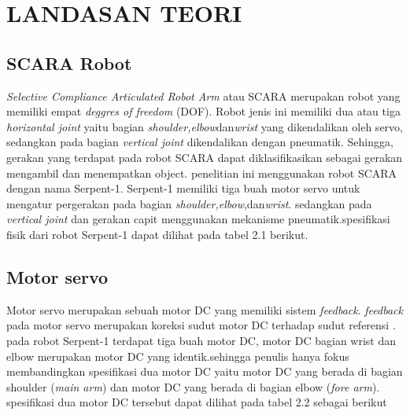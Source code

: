 \chapter{LANDASAN TEORI}

\section{SCARA Robot}
	\textit{Selective Compliance Articulated Robot Arm} atau SCARA merupakan robot yang memiliki empat \textit{deggres of freedom} (DOF). Robot jenis ini memiliki dua atau tiga \textit{horizontal joint} yaitu bagian \textit{shoulder,elbow}dan\textit{wrist} yang dikendalikan oleh servo, sedangkan pada bagian \textit{vertical joint} dikendalikan dengan pneumatik. Sehingga, gerakan yang terdapat pada robot SCARA dapat diklasifikasikan sebagai gerakan mengambil dan menempatkan object. penelitian ini menggunakan robot SCARA dengan nama Serpent-1. Serpent-1 memiliki tiga buah motor servo untuk mengatur pergerakan pada bagian \textit{shoulder,elbow},dan\textit{wrist}. sedangkan pada \textit{vertical joint} dan gerakan capit menggunakan mekanisme pneumatik.spesifikasi fisik dari robot Serpent-1 dapat dilihat pada tabel 2.1 berikut.

\begin{table}[H]
	\centering
	\caption{Spesifikasi Robot SCARA}
\end{table}

\section{Motor servo}
	Motor servo merupakan sebuah motor DC yang memiliki sistem \textit{feedback}. \textit{feedback} pada motor servo merupakan koreksi sudut motor DC terhadap sudut referensi \cite{Younkin2002}. pada robot Serpent-1 terdapat tiga buah motor DC, motor DC	 bagian wrist dan elbow merupakan motor DC yang identik.sehingga penulis hanya fokus membandingkan spesifikasi dua motor DC yaitu motor DC yang berada di bagian shoulder (\textit{main arm}) dan motor DC yang berada di bagian elbow (\textit{fore arm}). spesifikasi dua motor DC tersebut dapat dilihat pada tabel 2.2 sebagai berikut

